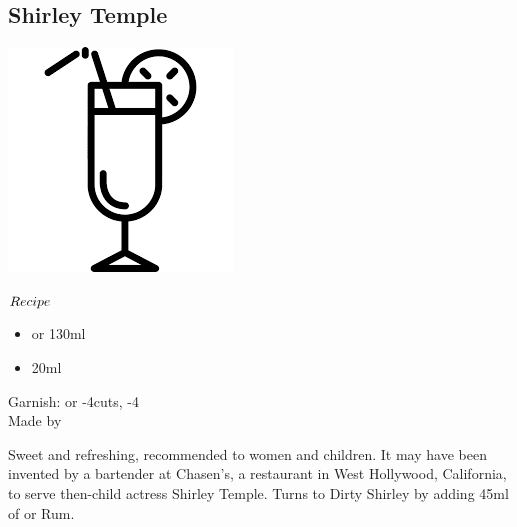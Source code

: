 \subsection{Shirley Temple}
\vspace{-7.4mm}
\hspace{42mm}
\includegraphics[scale=.07]{cocktail_glass_tall.png}
\vspace{2.5mm}
\begin{itembox}[l]{\boldmath $Recipe$}
\begin{itemize}
\setlength{\parskip}{0cm}
\setlength{\itemsep}{0cm}
\item \ga or \llsoda 130ml
\item \gs 20ml
\end{itemize}
\vspace{-4mm}
Garnish: \lemon or -4cuts, -4\\
Made by \build
\end{itembox}
Sweet and refreshing, recommended to women and children.
It may have been invented by a bartender at Chasen's, a restaurant in West Hollywood, California, to serve then-child actress Shirley Temple.
Turns to Dirty Shirley by adding 45ml of \vodka or Rum.
